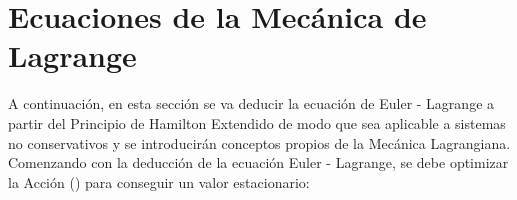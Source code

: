 \documentclass[/home/hernan/Documentos/Apuntes_mecanica_teorica/main.tex]{subfiles}
\begin{document}
    \section{Ecuaciones de la Mecánica de Lagrange}

    A continuación, en esta sección se va deducir la ecuación de Euler - Lagrange a partir del Principio de Hamilton Extendido de modo que sea aplicable a sistemas no conservativos y se introducirán conceptos propios de la Mecánica Lagrangiana. \\ 

    Comenzando con la deducción de la ecuación Euler - Lagrange, se debe optimizar la Acción () para conseguir un valor estacionario:
\end{document}
